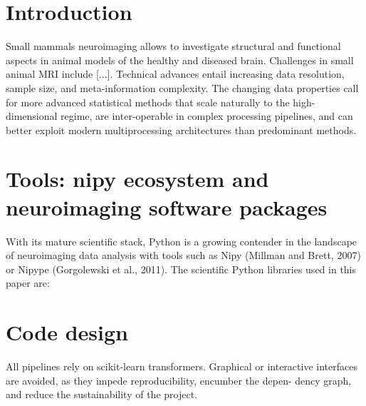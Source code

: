 \documentclass[utf8, a4paper, final, crop]{frontiersSCNS} %
\begin{document}
\section{Introduction}

Small mammals neuroimaging allows to investigate structural and functional aspects in animal models of the healthy and diseased brain. Challenges in small animal MRI include [...].
Technical advances entail increasing data resolution, sample size, and meta-information complexity. 
The changing data properties call for more advanced statistical methods that scale naturally to the high-dimensional regime, are inter-operable in complex processing pipelines, and can better exploit modern multiprocessing architectures than predominant methods.
%
%

\section{Tools: nipy ecosystem and neuroimaging software packages}

With its mature scientific stack, Python is a growing contender
in the landscape of neuroimaging data analysis with tools such as
Nipy (Millman and Brett, 2007) or Nipype (Gorgolewski et al.,
2011). The scientific Python libraries used in this paper are:
%
%

\section{Code design}

All pipelines rely on scikit-learn transformers.
Graphical or interactive interfaces are avoided, as
they impede reproducibility, encumber the depen-
dency graph, and reduce the sustainability of the
project.
\end{document}
